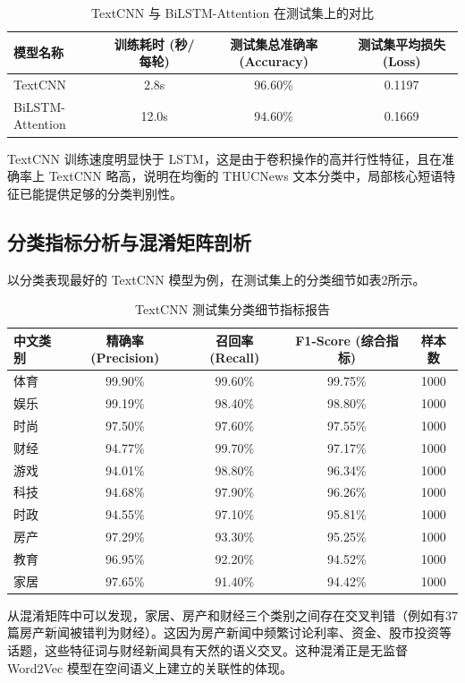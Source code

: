 \documentclass[UTF8,a4paper,11pt]{ctexart}
\begin{document}
\begin{table}[H]
\centering
\caption{TextCNN 与 BiLSTM-Attention 在测试集上的对比}
\label{tab:compare}
\begin{tabular}{lccc}
\toprule
模型名称 & 训练耗时 (秒/每轮) & 测试集总准确率 (Accuracy) & 测试集平均损失 (Loss) \\
\midrule
TextCNN & 2.8s & 96.60\% & 0.1197 \\
BiLSTM-Attention & 12.0s & 94.60\% & 0.1669 \\
\bottomrule
\end{tabular}
\end{table}

TextCNN 训练速度明显快于 LSTM，这是由于卷积操作的高并行性特征，且在准确率上 TextCNN 略高，说明在均衡的 THUCNews 文本分类中，局部核心短语特征已能提供足够的分类判别性。

\subsection{分类指标分析与混淆矩阵剖析}
以分类表现最好的 TextCNN 模型为例，在测试集上的分类细节如表2所示。

\begin{table}[H]
\centering
\caption{TextCNN 测试集分类细节指标报告}
\label{tab:metrics}
\begin{tabular}{lcccc}
\toprule
中文类别 & 精确率 (Precision) & 召回率 (Recall) & F1-Score (综合指标) & 样本数 \\
\midrule
体育 & 99.90\% & 99.60\% & 99.75\% & 1000 \\
娱乐 & 99.19\% & 98.40\% & 98.80\% & 1000 \\
时尚 & 97.50\% & 97.60\% & 97.55\% & 1000 \\
财经 & 94.77\% & 99.70\% & 97.17\% & 1000 \\
游戏 & 94.01\% & 98.80\% & 96.34\% & 1000 \\
科技 & 94.68\% & 97.90\% & 96.26\% & 1000 \\
时政 & 94.55\% & 97.10\% & 95.81\% & 1000 \\
房产 & 97.29\% & 93.30\% & 95.25\% & 1000 \\
教育 & 96.95\% & 92.20\% & 94.52\% & 1000 \\
家居 & 97.65\% & 91.40\% & 94.42\% & 1000 \\
\bottomrule
\end{tabular}
\end{table}

从混淆矩阵中可以发现，家居、房产和财经三个类别之间存在交叉判错（例如有37 篇房产新闻被错判为财经）。这因为房产新闻中频繁讨论利率、资金、股市投资等话题，这些特征词与财经新闻具有天然的语义交叉。这种混淆正是无监督 Word2Vec 模型在空间语义上建立的关联性的体现。
\end{document}

